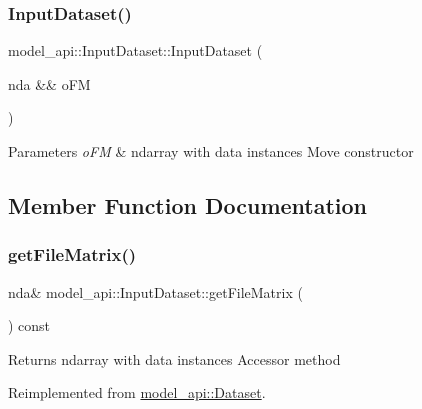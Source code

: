 \subsubsection{\texorpdfstring{Input\+Dataset()}{InputDataset()}\hspace{0.1cm}{\footnotesize\ttfamily [2/2]}}
{\footnotesize\ttfamily model\+\_\+api\+::\+Input\+Dataset\+::\+Input\+Dataset (\begin{DoxyParamCaption}\item[{nda \&\&}]{o\+FM }\end{DoxyParamCaption})}


\begin{DoxyParams}{Parameters}
{\em o\+FM} & ndarray with data instances Move constructor \\
\hline
\end{DoxyParams}


\subsection{Member Function Documentation}
\mbox{\label{classmodel__api_1_1InputDataset_a853b380f548e21ee7421f887b9be2722}} 
\subsubsection{\texorpdfstring{get\+File\+Matrix()}{getFileMatrix()}}
{\footnotesize\ttfamily nda\& model\+\_\+api\+::\+Input\+Dataset\+::get\+File\+Matrix (\begin{DoxyParamCaption}{ }\end{DoxyParamCaption}) const\hspace{0.3cm}{\ttfamily [virtual]}}

\begin{DoxyReturn}{Returns}
ndarray with data instances Accessor method 
\end{DoxyReturn}


Reimplemented from \hyperlink{classmodel__api_1_1Dataset_aa2ae7007705796c05e5df64a3d1cda0e}{model\+\_\+api\+::\+Dataset}.

\mbox{\label{classmodel__api_1_1InputDataset_af7d130afc8889825573e738906397714}} 
